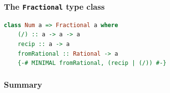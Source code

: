\documentclass[10pt,pdf,utf8,russian,aspectratio=169]{beamer}
\begin{document}
\begin{frame}[fragile]
  \frametitle{The \verb"Fractional" type class}

\begin{lstlisting}[language=Haskell]
  class Num a => Fractional a where
    (/) :: a -> a -> a
    recip :: a -> a
    fromRational :: Rational -> a
    {-# MINIMAL fromRational, (recip | (/)) #-}
  \end{lstlisting}
\end{frame}

\begin{frame}
  \frametitle{Summary}
\end{frame}
\end{document}
